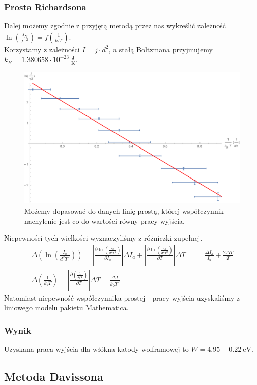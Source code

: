 \documentclass[paper=a4, fontsize=12pt]{scrartcl}
\begin{document}
\subsubsection{Prosta Richardsona}
Dalej możemy zgodnie z przyjętą metodą przez nas wykreślić zależność $\ln(\frac{J_N}{T^{-2}})=f(\frac{1}{k_bT})$. \\Korzystamy z zależności $I=j\cdot d^2$, a stałą Boltzmana przyjmujemy $k_B=1.380658 \cdot10^{-23}\:\mathrm{\frac{J}{K}}$.
\clearpage
\begin{figure}[h!]
\centering
\includegraphics[width=0.8\linewidth]{prrich}
\caption{Możemy dopasować do danych linię prostą, której współczynnik nachylenie jest co do wartości równy pracy wyjścia. }
\label{fig:prrich}
\end{figure}
Niepewności tych wielkości wyznaczyliśmy z różniczki zupełnej.
\begin{align*}
\Delta(\ln\left(\frac{I_a}{d^2T^2}\right))=\left|\frac{\partial\ln\left(\frac{I_a}{d^2T^2}\right)}{\partial I_a}\right|\Delta I_a +
\left|\frac{\partial\ln\left(\frac{I_a}{d^2T^2}\right)}{\partial T}\right|\Delta T=
=\frac{\Delta I_a}{I_a}+\frac{2 \Delta T}{T}\\
\Delta \left(\frac{1}{k_bT}\right)=\left|\frac{\partial\left(\frac{1}{k_bT}\right)}{\partial T}\right|\Delta T=
\frac{\Delta T}{k_b T^2}
\end{align*}
Natomiast niepewność współczynnika prostej - pracy wyjścia uzyskaliśmy z liniowego modelu pakietu Mathematica.
\subsubsection{Wynik}
Uzyskana praca wyjścia dla włókna katody wolframowej to $W=4.95\pm0.22\:\mathrm{eV}$.
\subsection{Metoda Davissona}
\end{document}
